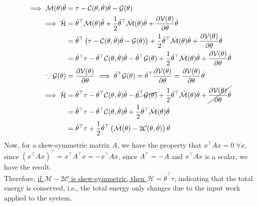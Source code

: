 \begin{align*}
    \implies
    \mathcal{M}(\theta) \ddot{\theta}
     & =
    \tau
    -
    \mathcal{C}(\theta, \dot{\theta}) \dot{\theta}
    -
    \mathcal{G}(\theta)
    \\
    \implies
    \dot{\mathcal{H}}
     & =
    \dot{\theta}^{\top} \mathcal{M}(\theta) \ddot{\theta}
    +
    \frac{1}{2}
    \dot{\theta}^{\top} \dot{\mathcal{M}}(\theta) \dot{\theta}
    +
    \frac{\partial \mathcal{V}(\theta)}{\partial \theta} \dot{\theta}
    \\
     & =
    \dot{\theta}^{\top} \left( \tau - \mathcal{C}(\theta, \dot{\theta}) \dot{\theta} - \mathcal{G}(\theta) \right)
    +
    \frac{1}{2}
    \dot{\theta}^{\top} \dot{\mathcal{M}}(\theta) \dot{\theta}
    +
    \frac{\partial \mathcal{V}(\theta)}{\partial \theta} \dot{\theta}
    \\ & =
    \dot{\theta}^{\top} \tau
    -
    \dot{\theta}^{\top} \mathcal{C}(\theta, \dot{\theta}) \dot{\theta}
    -
    \dot{\theta}^{\top} \mathcal{G}(\theta)
    +
    \frac{1}{2}
    \dot{\theta}^{\top} \dot{\mathcal{M}}(\theta) \dot{\theta}
    +
    \frac{\partial \mathcal{V}(\theta)}{\partial \theta} \dot{\theta}
    \\
    \because
    \mathcal{G}(\theta)
     & =
    \frac{\partial \mathcal{V}(\theta)}{\partial \theta}
    \implies
    \dot{\theta}^{\top} \mathcal{G}(\theta)
    =
    \dot{\theta}^{\top} \frac{\partial \mathcal{V}(\theta)}{\partial \theta}
    =
    \frac{\partial \mathcal{V}(\theta)}{\partial \theta} \dot{\theta}
    \\
    \implies
    \dot{\mathcal{H}}
     & =
    \dot{\theta}^{\top} \tau
    -
    \dot{\theta}^{\top} \mathcal{C}(\theta, \dot{\theta}) \dot{\theta}
    -
    \cancel{\dot{\theta}^{\top} \mathcal{G}(\theta)}
    +
    \frac{1}{2}
    \dot{\theta}^{\top} \dot{\mathcal{M}}(\theta) \dot{\theta}
    +
    \cancel{\frac{\partial \mathcal{V}(\theta)}{\partial \theta} \dot{\theta}}
    \\ & =
    \dot{\theta}^{\top} \tau
    -
    \dot{\theta}^{\top} \mathcal{C}(\theta, \dot{\theta}) \dot{\theta}
    +
    \frac{1}{2}
    \dot{\theta}^{\top} \dot{\mathcal{M}}(\theta) \dot{\theta}
    \\ & =
    \dot{\theta}^{\top} \tau
    +
    \frac{1}{2}
    \dot{\theta}^{\top} \left(
    \dot{\mathcal{M}}(\theta)
    -
    2 \mathcal{C}(\theta, \dot{\theta})
    \right)
    \dot{\theta}
\end{align*}
Now, for a skew-symmetric matrix \( A \), we have the property that \( x^\top A x = 0 \; \forall x \), since \( {(x^\top A x)}^\top = x^\top A^\top x = -x^\top A x \), since \( A^\top = -A \) and \( x^\top A x \) is a scalar, we have the result. \\
Therefore, \underline{if \( \dot{\mathcal{M}}-2 \mathcal{C} \) is skew-symmetric, then \( \dot{\mathcal{H}} = \dot{\theta}^{\top} \tau \)}, indicating that the total energy is conserved, i.e., the total energy only changes due to the input work applied to the system.
